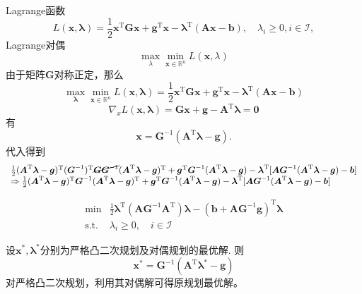 Lagrange函数
\[
    L(\boldsymbol{x},\boldsymbol{\lambda})=\frac{1}{2}\boldsymbol{x}^{\mathrm{T}}\boldsymbol{G}\boldsymbol{x}+\boldsymbol{g}^{\mathrm{T}}\boldsymbol{x}-\boldsymbol{\lambda}^{\mathrm{T}}(\boldsymbol{A}\boldsymbol{x}-\boldsymbol{b}),\quad\lambda_{i}\geqslant0,i\in\mathcal{I},
\]
Lagrange对偶
\[
    \max_{\lambda}\min_{\boldsymbol{x}\in\mathbb{R}^n}L(\boldsymbol{x},\lambda)
\]
由于矩阵$\boldsymbol{G}$对称正定，那么
\[
    \max_{\boldsymbol{\lambda}}\boxed{\min_{\boldsymbol{x}\in\mathbb{R}^n}L(\boldsymbol{x},\boldsymbol{\lambda})=\frac{1}{2}\boldsymbol{x}^\mathrm{T}\boldsymbol{G}\boldsymbol{x}+\boldsymbol{g}^\mathrm{T}\boldsymbol{x}-\boldsymbol{\lambda}^\mathrm{T}(\boldsymbol{A}\boldsymbol{x}-\boldsymbol{b})}
\]
\[
    \nabla_x L(\boldsymbol{x},\boldsymbol{\lambda}) = \boldsymbol{Gx}+\boldsymbol{g}-\boldsymbol{A}^{\mathrm{T}}\boldsymbol{\lambda} = \boldsymbol{0} 
\]
有
\[
    \boldsymbol{x}=\boldsymbol{G}^{-1}(\boldsymbol{A}^{\mathrm{T}}\boldsymbol{\lambda}-\boldsymbol{g}).
\]
代入得到
\[
    \begin{array}{l}
        \frac{1}{2}(\boldsymbol{A}^{\mathrm{T}}\boldsymbol{\lambda}-\boldsymbol{g})^\mathrm{T}(\boldsymbol{G}^{-1})^\mathrm{T}\cancel{\boldsymbol{G}\boldsymbol{G}^{-1}}(\boldsymbol{A}^{\mathrm{T}}\boldsymbol{\lambda}-\boldsymbol{g})^{\mathrm{T}}+\boldsymbol{g}^\mathrm{T}\boldsymbol{G}^{-1}(\boldsymbol{A}^{\mathrm{T}}\boldsymbol{\lambda}-\boldsymbol{g})-\boldsymbol{\lambda}^\mathrm{T}[\boldsymbol{A}\boldsymbol{G}^{-1}(\boldsymbol{A}^{\mathrm{T}}\boldsymbol{\lambda}-\boldsymbol{g})-\boldsymbol{b}]\\
        \Rightarrow \frac{1}{2}(\boldsymbol{A}^{\mathrm{T}}\boldsymbol{\lambda}-\boldsymbol{g})^\mathrm{T}\boldsymbol{G}^{-1}(\boldsymbol{A}^{\mathrm{T}}\boldsymbol{\lambda}-\boldsymbol{g})^{\mathrm{T}}+\boldsymbol{g}^\mathrm{T}\boldsymbol{G}^{-1}(\boldsymbol{A}^{\mathrm{T}}\boldsymbol{\lambda}-\boldsymbol{g})-\boldsymbol{\lambda}^\mathrm{T}[\boldsymbol{A}\boldsymbol{G}^{-1}(\boldsymbol{A}^{\mathrm{T}}\boldsymbol{\lambda}-\boldsymbol{g})-\boldsymbol{b}]\\
    \end{array}
\]

\[
    \begin{array}{ll}
        \min & \frac{1}{2}\boldsymbol{\lambda}^{\mathrm{T}}(\boldsymbol{AG}^{-1}\boldsymbol{A}^{\mathrm{T}})\boldsymbol{\lambda}-(\boldsymbol{b}+\boldsymbol{AG}^{-1}\boldsymbol{g})^{\mathrm{T}}\boldsymbol{\lambda}\\
        \mathrm{s.t.}&\lambda_{i}\geqslant 0,\quad i\in\mathcal{I}
    \end{array}
\]
\begin{theorem}
    设$\boldsymbol{x}^*,\boldsymbol{\lambda}^*$分别为严格凸二次规划及对偶规划的最优解. 则
    \[
        \boldsymbol{x}^* = \boldsymbol{G}^{-1}(\boldsymbol{A}^{\mathrm{T}}\boldsymbol{\lambda}^*-\boldsymbol{g})
    \]
    \textcolor{red!50}{对严格凸二次规划，利用其对偶解可得原规划最优解。}
\end{theorem}
